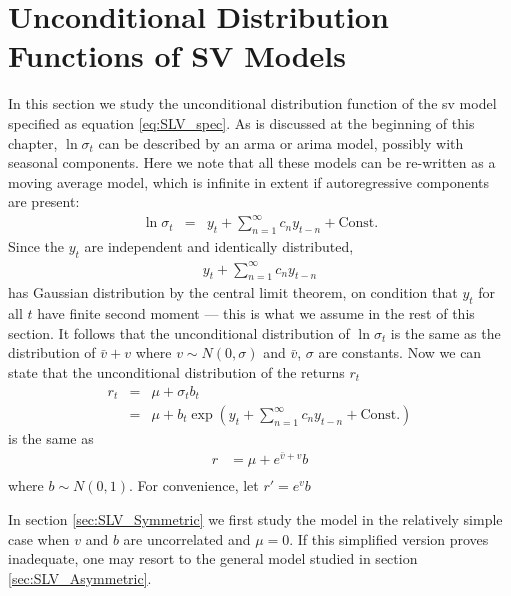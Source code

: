\section{Unconditional Distribution Functions of SV Models}
\label{sec:XieCalc}
In this section we study the unconditional distribution function of
the \gls{sv} model specified as equation
\ref{eq:SLV_spec}. As is discussed at the beginning of this chapter,
$\ln\sigma_t$ can be described by an \gls{arma} or \gls{arima} model,
possibly with seasonal components. Here we note that all these models
can be re-written as a moving average model, which is infinite in extent if
autoregressive components are present:
\begin{eqnarray*}
  \ln \sigma_t &=& y_t + \sum_{n=1}^\infty c_n y_{t-n} + \text{Const.}
\end{eqnarray*}
Since the $y_t$ are independent and identically distributed,
\begin{eqnarray*}
  y_t + \sum_{n=1}^\infty c_n y_{t-n}  
\end{eqnarray*}
has Gaussian distribution by the central limit theorem, on condition
that $y_t$ for all $t$ have finite second moment --- this is what we
assume in the rest of this section. It follows that the unconditional
distribution of $\ln \sigma_t$ is the same as the distribution of
$\bar{v} + v$ where $v \sim N(0, \sigma)$ and $\bar{v}$, $\sigma$ are
constants. Now we can state that the unconditional distribution of the
returns $r_t$
\begin{eqnarray*}
  r_t &=& \mu + \sigma_t b_t\\
  &=& \mu + b_t \exp\left(
    y_t + \sum_{n=1}^\infty c_n y_{t-n} + \text{Const.}
  \right)
\end{eqnarray*}
 is the same as
\begin{equation}  \label{eq:UnconditionalPdf}
  \begin{aligned}
    r &= \mu + e^{\bar{v} + v} b \\
  \end{aligned}
\end{equation}
where $b \sim N(0, 1)$. For convenience, let $r' = e^v b$

In section \ref{sec:SLV_Symmetric} we first study the model in the
relatively simple case when $v$ and $b$ are uncorrelated and $\mu
= 0$. If this simplified version proves inadequate, one may resort to
the general model studied in section \ref{sec:SLV_Asymmetric}.

